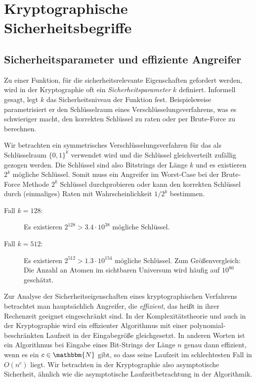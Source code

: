 \chapter{Kryptographische Sicherheitsbegriffe}\label{chap:krypt-begriffe}
\section{Sicherheitsparameter und effiziente Angreifer}\label{sec:secparam}
Zu einer Funktion, für die sicherheitsrelevante Eigenschaften gefordert werden, wird in der Kryptographie oft ein \emph{Sicherheitsparameter} $k$ definiert. Informell gesagt, legt $k$ das Sicherheitsniveau der Funktion fest. Beispielsweise parametrisiert er den Schlüsselraum eines Verschlüsselungsverfahrens, was es schwieriger macht, den korrekten Schlüssel zu raten oder per Brute-Force zu berechnen.
\begin{beispiel}
	Wir betrachten ein symmetrisches Verschlüsselungsverfahren für das als Schlüsselraum $\{0,1\}^k$ verwendet wird und die Schlüssel gleichverteilt zufällig gezogen werden. Die Schlüssel sind also Bitstrings der Länge $k$ und es existieren $2^k$ mögliche Schlüssel. Somit muss ein Angreifer im Worst-Case bei der Brute-Force Methode $2^k$ Schlüssel durchprobieren oder kann den korrekten Schlüssel durch (einmaliges) Raten mit Wahrscheinlichkeit $1/2^k$ bestimmen. 
	\begin{description}
		\item[Fall $k=128$:] Es existieren $2^{128} > 3.4 \cdot  10^{38}$ mögliche Schlüssel. 
		\item[Fall $k=512$:] Es existieren $2^{512} > 1.3 \cdot 10^{154}$ mögliche Schlüssel. Zum Größenvergleich: 
		Die Anzahl an Atomen im sichtbaren Universum wird häufig auf $10^{80}$ geschätzt.  
	\end{description}
	
\end{beispiel}

Zur Analyse der Sicherheitseigenschaften eines kryptographischen Verfahrens betrachtet man hauptsächlich Angreifer, die \emph{effizient}, das heißt in ihrer Rechenzeit geeignet eingeschränkt sind. In der Komplexitätstheorie und auch in der Kryptographie wird ein effizienter Algorithmus mit einer polynomial-beschränkten Laufzeit in der Eingabegröße gleichgesetzt. 
In anderen Worten ist ein Algorithmus bei Eingabe eines Bit-Strings der Länge $n$ genau dann effizient, wenn es ein $c \in \mathbbm{N}$ gibt, so dass seine Laufzeit im schlechtesten Fall in $O(n^c)$ liegt. Wir betrachten in der Kryptographie also asymptotische Sicherheit, ähnlich wie die asymptotische Laufzeitbetrachtung in der Algorithmik.

